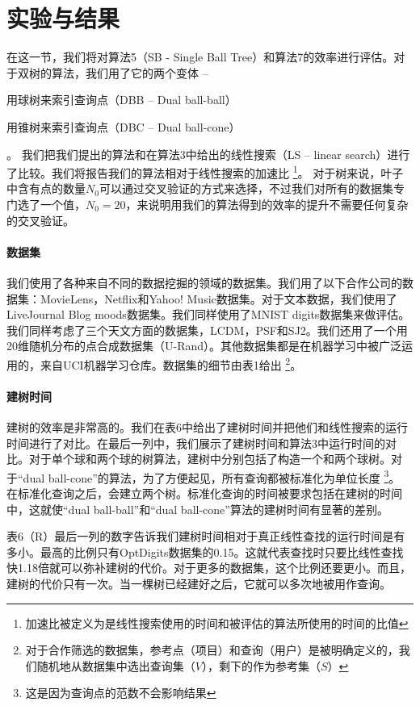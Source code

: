 \documentclass[twocolumn]{article}
\begin{document}
\section{实验与结果}
在这一节，我们将对算法5（SB - Single Ball Tree）和算法7的效率进行评估。对于双树的算法，我们用了它的两个变体 --
\begin{enumerate*}[label={\roman*}]
\item 用球树来索引查询点（DBB -- Dual ball-ball）
\item 用锥树来索引查询点（DBC -- Dual ball-cone）
\end{enumerate*}。
我们把我们提出的算法和在算法3中给出的线性搜索（LS -- linear search）进行了比较。我们将报告我们的算法相对于线性搜索的加速比
\footnote{加速比被定义为是线性搜索使用的时间和被评估的算法所使用的时间的比值}。
对于树来说，叶子中含有点的数量$N_0$可以通过交叉验证的方式来选择，不过我们对所有的数据集专门选了一个值，$N_0 = 20$，来说明用我们的算法得到的效率的提升不需要任何复杂的交叉验证。

\paragraph{数据集}
我们使用了各种来自不同的数据挖掘的领域的数据集。我们用了以下合作公司的数据集：MovieLens，Netflix和Yahoo! Music数据集。对于文本数据，我们使用了LiveJournal Blog moods数据集。我们同样使用了MNIST digits数据集来做评估。我们同样考虑了三个天文方面的数据集，LCDM，PSF和SJ2。我们还用了一个用20维随机分布的点合成数据集（U-Rand）。其他数据集都是在机器学习中被广泛运用的，来自UCI机器学习仓库。数据集的细节由表1给出
\footnote{对于合作筛选的数据集，参考点（项目）和查询（用户）是被明确定义的，我们随机地从数据集中选出查询集（$V$），剩下的作为参考集（$S$）}。

\paragraph{建树时间}
建树的效率是非常高的。我们在表6中给出了建树时间并把他们和线性搜索的运行时间进行了对比。在最后一列中，我们展示了建树时间和算法3中运行时间的对比。对于单个球和两个球的树算法，建树中分别包括了构造一个和两个球树。对于“dual ball-cone”的算法，为了方便起见，所有查询都被标准化为单位长度
\footnote{这是因为查询点的范数不会影响结果}。
在标准化查询之后，会建立两个树。标准化查询的时间被要求包括在建树的时间中，这就使“dual ball-ball”和“dual ball-cone”算法的建树时间有显著的差别。

表6（R）最后一列的数字告诉我们建树时间相对于真正线性查找的运行时间是有多小。最高的比例只有OptDigits数据集的0.15。这就代表查找时只要比线性查找快1.18倍就可以弥补建树的代价。对于更多的数据集，这个比例还要更小。而且，建树的代价只有一次。当一棵树已经建好之后，它就可以多次地被用作查询。
\end{document}
